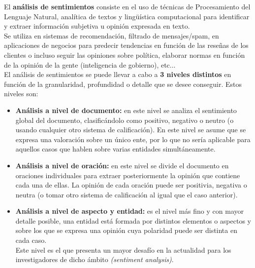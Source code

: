 \documentclass[a4paper,12pt]{report}
\begin{document}
\vspace{4mm}
El \textbf{análisis de sentimientos} consiste en el uso de técnicas de Procesamiento del Lenguaje Natural, analítica de textos y lingüística computacional para identificar y extraer información subjetiva u opinión expresada en texto. 
\vspace{2mm}\\
Se utiliza en sistemas de recomendación, filtrado de mensajes/spam, en aplicaciones de negocios para predecir tendencias en función de las reseñas de los clientes o incluso seguir las opiniones sobre política, elaborar normas en función de la opinión de la gente (inteligencia de gobierno), etc...
\vspace{4mm}\\
El análisis de sentimientos se puede llevar a cabo a \textbf{3 niveles distintos} en función de la granularidad, profundidad o detalle que se desee conseguir. Estos niveles son:

\begin{itemize}
\item \textbf{Análisis a nivel de documento:} en este nivel se analiza el sentimiento global del documento, clasificándolo como positivo, negativo o neutro (o usando cualquier otro sistema de calificación). En este nivel se asume que se expresa una valoración sobre un único ente, por lo que no sería aplicable para aquellos casos que hablen sobre varias entidades simultáneamente.  

\item \textbf{Análisis a nivel de oración:} en este nivel se divide el documento en oraciones individuales para extraer posteriormente la opinión que contiene cada una de ellas. La opinión de cada oración puede ser positivia, negativa o neutra (o tomar otro sistema de calificación al igual que el caso anterior). 

\item \textbf{Análisis a nivel de aspecto y entidad:} es el nivel más fino y con mayor detalle posible, una entidad está formada por distintos elementos o aspectos y sobre los que se expresa una opinión cuya polaridad puede ser distinta en cada caso. 
\vspace{2mm}\\
Este nivel es el que presenta un mayor desafío en la actualidad para los investigadores de dicho ámbito \textit{(sentiment analysis)}. 

\end{itemize}
\vspace{2mm}
\end{document}
